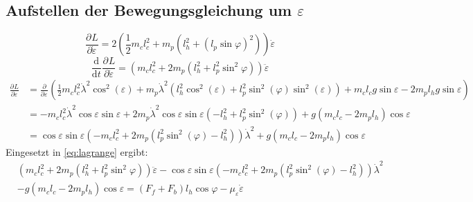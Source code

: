 \documentclass[times, 10pt,twocolumn]{article}
\newcommand{\partiell}[3][]{\frac{\partial^{#1}#2}{\partial{#3}^{#1}}}
\newcommand{\diff}[3][]{\frac{\mathrm{d}^{#1}#2}{\mathrm{d}{#3}^{#1}}}
\begin{document}
	\subsection{Aufstellen der Bewegungsgleichung um $\varepsilon$}
	\begin{equation}
	\partiell{L}{\dot{\varepsilon}} = 2(\frac{1}{2}m_cl_c^2
	+ m_p(l_h^2+(l_p\sin \varphi)^2))\dot{\varepsilon}
	\end{equation}
	\begin{equation}
	\diff{}{t}\partiell{L}{\dot{\varepsilon}} = (m_cl_c^2
	+ 2 m_p(l_h^2+l_p^2\sin^2 \varphi))\ddot{\varepsilon}
	\end{equation}
	\begin{equation}
	\begin{split}
	\partiell{L}{\varepsilon} &= \partiell{}{\varepsilon}(\frac{1}{2} m_c l_c^2 \dot{\lambda}^2 \cos^2 (\varepsilon) + m_p \dot{\lambda}^2 (l_h^2 \cos^2 (\varepsilon) + l_p^2 \sin^2 (\varphi) \sin^2 (\varepsilon))
	+ m_c l_c g \sin \varepsilon - 2 m_p l_h g \sin \varepsilon)\\
	&= -m_c l_c^2 \dot{\lambda}^2 \cos \varepsilon \sin \varepsilon + 2 m_p \dot{\lambda}^2 \cos \varepsilon \sin \varepsilon (-l_h^2  + l_p^2 \sin^2 (\varphi) ) + g(m_c l_c - 2 m_p l_h) \cos \varepsilon\\
	&= \cos \varepsilon \sin \varepsilon  (-m_c l_c^2 + 2 m_p (l_p^2 \sin^2 (\varphi) -l_h^2  )) \dot{\lambda}^2+ g(m_c l_c - 2 m_p l_h) \cos \varepsilon
	\end{split}
	\end{equation}
	Eingesetzt in \eqref{eq:lagrange} ergibt:
	\begin{equation}
	\begin{split}
	&(m_cl_c^2+ 2 m_p(l_h^2+l_p^2\sin^2 \varphi))\ddot{\varepsilon} - \cos \varepsilon \sin \varepsilon (-m_c l_c^2 + 2 m_p (l_p^2 \sin^2 (\varphi) -l_h^2  ))\dot{\lambda}^2 \\
	& - g(m_c l_c - 2 m_p l_h) \cos \varepsilon = (F_f + F_b)l_h  \cos \varphi - \mu_\varepsilon \dot{\varepsilon}
	\end{split}
	\end{equation}
	
\end{document}
